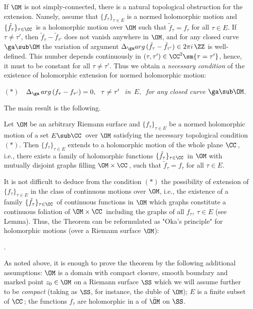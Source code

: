 If $\OM$ is not simply-connected, there is a natural topological
obstruction for the extension.
Namely, assume that $\{f_\tau\}_{\tau\in E}$ is a normed holomorphic motion
and $\{\tilde f_\tau\}_{\tau\in\CC\,}$ is a holomorphic motion over
$\OM$ such that $\tilde f_\tau=f_\tau$ for all $\tau\in E$.
If $\tau\not=\tau'$, then $\tilde f_\tau-\tilde f_{\tau'}$ does not vanish
anywhere in $\OM$, and for any closed curve $\ga\sub\OM$ the variation of
argument $\Delta_\ga arg\,(\tilde f_\tau-\tilde
f_{\tau'})\in 2\pi i\,\ZZ$ is well-defined.
This number depends continuously in
$(\tau,\tau')\in\CC^2\sm\{\tau=\tau'\}$, hence, it must to be constant
for all $\tau\not=\tau'$.
Thus we obtain a {\it necessary condition} of the existence of
holomorphic extension for normed holomorphic motion:

\medpagebreak \np $(*)$ $\ \ \Delta_\ga\,arg\,(f_\tau-f_{\tau'})
=0,\ \ \tau\not=\tau'\ $ {\it in\,} $E, \ $ {\it for any closed curve\/}
$\ga\sub\OM$.

\medpagebreak The main result is the following.

 Let $\OM$ be an arbitrary Riemann surface and
 $\{f_\tau\}_{\tau\in E}$ be a normed holomorphic motion of a set
 $E\sub\CC\,$ over $\OM$ satisfying the necessary topological condition
 $(*)$.
Then $\{f_\tau\}_{\tau\in E}$ extends to a holomorphic motion of the
whole plane $\CC\,$, i.e., there exists a family of holomorphic functions
$\{\tilde f_\tau\}_{\tau\in\CC\,}$ in $\OM$ with mutually disjoint graphs
filling $\OM\times\CC\,$, such that $\tilde f_\tau=f_\tau$ for all
$\tau\in E$.
\endproclaim

It is not difficult to deduce from the condition $(*)$ the possibility of
extension of $\{f_\tau\}_{\tau\in E}$ in the class of continuous motions
over $\OM$, i.e., the existence of a family
$\{\tilde f_\tau\}_{\tau\in\CC\,}$ of continuous functions in
 $\OM$ which graphs constitute a continuous foliation of
 $\OM\times\CC\,$ including the graphs of all $f_\tau,\ \tau\in E$
(see Lemma).
Thus, the Theorem can be reformulated as "Oka's principle" for holomorphic
motions (over a Riemann surface $\OM$):

\smallpagebreak
{}.
\smallpagebreak

As noted above, it is enough to prove the theorem by the following
additional assumptions:
$\OM$ is a domain with compact closure, smooth boundary and marked point
$z_0\in\OM$ on a Riemann surface $\SS$ which we will assume further to
be {\it compact} (taking as $\SS$, for instance, the duble of $\OM$);
$E$ is a finite subset of $\CC\,$;
the functions $f_\tau$ are holomorphic in a \nbh of
$\bar\OM$ on $\SS$.

